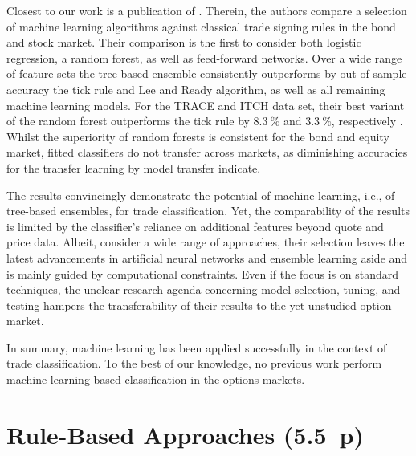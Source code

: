 Closest to our work is a publication of \textcite[1--58]{ronenMachineLearningTrade2022}. Therein, the authors compare a selection of machine learning algorithms against classical trade signing rules in the bond and stock market. Their comparison is the first to consider both logistic regression, a random forest, as well as feed-forward networks. Over a wide range of feature sets the tree-based ensemble consistently outperforms by out-of-sample accuracy the tick rule and Lee and Ready algorithm, as well as all remaining machine learning models. For the TRACE and ITCH data set, their best variant of the random forest outperforms the tick rule by $8.3~\%$ and $3.3~\%$, respectively \autocite[57]{ronenMachineLearningTrade2022}. Whilst the superiority of random forests is consistent for the bond and equity market, fitted classifiers do not transfer across markets, as diminishing accuracies for the transfer learning by model transfer indicate.

The results convincingly demonstrate the potential of machine learning, i.e., of tree-based ensembles, for trade classification. Yet, the comparability of the results is limited by the classifier's reliance on additional features beyond quote and price data. Albeit, \textcite[4]{ronenMachineLearningTrade2022} consider a wide range of approaches, their selection leaves the latest advancements in artificial neural networks and ensemble learning aside and is mainly guided by computational constraints. Even if the focus is on standard techniques, the unclear research agenda concerning model selection, tuning, and testing hampers the transferability of their results to the yet unstudied option market.

In summary, machine learning has been applied successfully in the context of trade classification. To the best of our knowledge, no previous work perform machine learning-based classification in the options markets.

\newpage
\section{Rule-Based Approaches (5.5~p)}\label{sec:rule-based-approaches}




